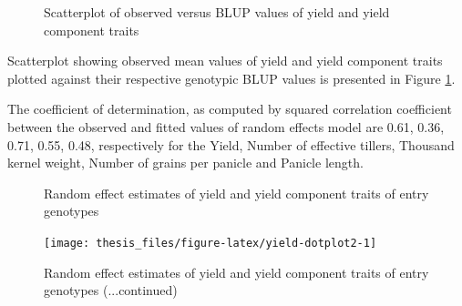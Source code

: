\documentclass[12pt,oneside]{dukestatscithesis} %
\begin{document}
\begin{figure}[H]

{\centering {}\newline{}\newline{}

}

\caption{Scatterplot of observed versus BLUP values of yield and yield component traits}\label{fig:yield-blup-viz}
\end{figure}
Scatterplot showing observed mean values of yield and yield component traits plotted against their respective genotypic BLUP values is presented in Figure \ref{fig:yield-blup-viz}.

The coefficient of determination, as computed by squared correlation coefficient between the observed and fitted values of random effects model are 0.61, 0.36, 0.71, 0.55, 0.48, respectively for the Yield, Number of effective tillers, Thousand kernel weight, Number of grains per panicle and Panicle length.
\begin{figure}[H]

{\centering {}\newline{}

}

\caption{Random effect estimates of yield and yield component traits of entry genotypes}\label{fig:yield-dotplot}
\end{figure}
\begin{figure}[H]

{\centering \texttt{[image: thesis\_files/figure-latex/yield-dotplot2-1]} 

}

\caption{Random effect estimates of yield and yield component traits of entry genotypes (...continued)}\label{fig:yield-dotplot2}
\end{figure}
\clearpage
\end{document}
